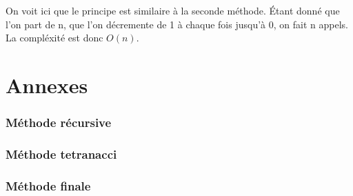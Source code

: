 \documentclass{article}
\newcommand{\code}[1]{}
\begin{document}
On voit ici que le principe est similaire à la seconde méthode. \'Etant donné que l'on part de n, que l'on décremente de 1 à chaque fois jusqu'à 0, on fait n appels. La compléxité est donc $O(n)$.

\newpage
\part{Annexes}
\section*{Méthode récursive}
\code{Algos/Problem117_1_rapport.py}


\section*{Méthode tetranacci}
\code{Algos/Problem117_2_rapport.py}

\newpage
\section*{Méthode finale}
\code{Algos/Problem117_3_rapport.py}
\end{document}

